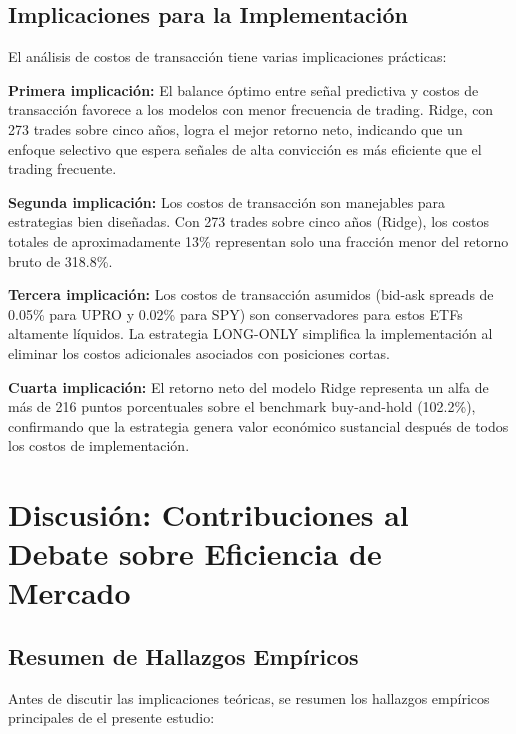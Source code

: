 \documentclass[11pt,a4paper]{article}
\begin{document}
\subsection{Implicaciones para la Implementación}

El análisis de costos de transacción tiene varias implicaciones prácticas:

\textbf{Primera implicación:} El balance óptimo entre señal predictiva y costos de transacción favorece a los modelos con menor frecuencia de trading. Ridge, con 273 trades sobre cinco años, logra el mejor retorno neto, indicando que un enfoque selectivo que espera señales de alta convicción es más eficiente que el trading frecuente.

\textbf{Segunda implicación:} Los costos de transacción son manejables para estrategias bien diseñadas. Con 273 trades sobre cinco años (Ridge), los costos totales de aproximadamente 13\% representan solo una fracción menor del retorno bruto de 318.8\%.

\textbf{Tercera implicación:} Los costos de transacción asumidos (bid-ask spreads de 0.05\% para UPRO y 0.02\% para SPY) son conservadores para estos ETFs altamente líquidos. La estrategia LONG-ONLY simplifica la implementación al eliminar los costos adicionales asociados con posiciones cortas.

\textbf{Cuarta implicación:} El retorno neto del modelo Ridge representa un alfa de más de 216 puntos porcentuales sobre el benchmark buy-and-hold (102.2\%), confirmando que la estrategia genera valor económico sustancial después de todos los costos de implementación.

\section{Discusión: Contribuciones al Debate sobre Eficiencia de Mercado}

\subsection{Resumen de Hallazgos Empíricos}

Antes de discutir las implicaciones teóricas, se resumen los hallazgos empíricos principales de el presente estudio:
\end{document}
